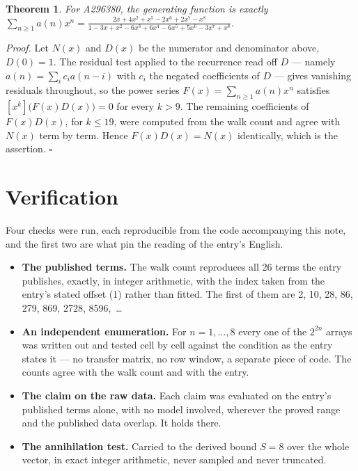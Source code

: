 \documentclass[11pt]{article}
\newtheorem{theorem}{Theorem}
\theoremstyle{definition}
\begin{document}
\begin{theorem} For A296380, the generating function is exactly $\sum_{n\ge 1} a(n)x^n = \frac{2x + 4x^{2} + x^{5} - 2x^{6} + 2x^{7} - x^{8}}{1 - 3x + x^{2} - 6x^{3} + 6x^{4} - 6x^{5} + 5x^{6} - 3x^{7} + x^{8}}$.\end{theorem}

{\itshape Proof.} Let $N(x)$ and $D(x)$ be the numerator and denominator above, $D(0)=1$. The residual test applied to the recurrence read off $D$ --- namely $a(n) = \sum_i c_i a(n-i)$ with $c_i$ the negated coefficients of $D$ --- gives vanishing residuals throughout, so the power series $F(x)=\sum_{n\ge 1}a(n)x^n$ satisfies $[x^k]\bigl(F(x)D(x)\bigr) = 0$ for every $k > 9$. The remaining coefficients of $F(x)D(x)$, for $k \le 19$, were computed from the walk count and agree with $N(x)$ term by term. Hence $F(x)D(x) = N(x)$ identically, which is the assertion. $\square$

\section{Verification}

Four checks were run, each reproducible from the code accompanying this note, and the first two are what pin the reading of the entry's English.

\begin{itemize}

\item {\bfseries The published terms.} The walk count reproduces all 26 terms the entry publishes, exactly, in integer arithmetic, with the index taken from the entry's stated offset (1) rather than fitted. The first of them are 2, 10, 28, 86, 279, 869, 2728, 8596,~\dots

\item {\bfseries An independent enumeration.} For $n = 1,\dots,8$ every one of the $2^{2n}$ arrays was written out and tested cell by cell against the condition as the entry states it --- no transfer matrix, no row window, a separate piece of code. The counts agree with the walk count and with the entry.

\item {\bfseries The claim on the raw data.} Each claim was evaluated on the entry's published terms alone, with no model involved, wherever the proved range and the published data overlap. It holds there.

\item {\bfseries The annihilation test.} Carried to the derived bound $S = 8$ over the whole vector, in exact integer arithmetic, never sampled and never truncated.

\end{itemize}
\end{document}
